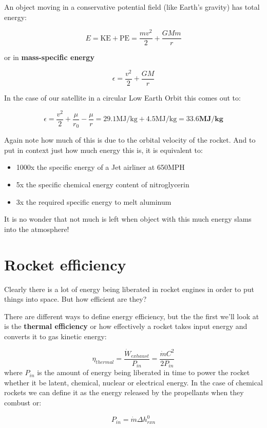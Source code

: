 \documentclass[twocolumn]{memoir} %
\begin{document}
An object moving in a conservative potential field (like Earth's
gravity) has total energy:

\[E = \text{KE} + \text{PE} = \frac{m v^2}{2} + \frac{GMm}{r}\]

or in \textbf{mass-specific energy}

\[\epsilon = \frac{v^2}{2} + \frac{GM}{r}\]

In the case of our satellite in a circular Low Earth Orbit this comes
out to:

\[\epsilon = \frac{v^2}{2} + \frac{\mu}{r_0} - \frac{\mu}{r} = 29.1 \text{MJ/kg} + 4.5 \text{MJ/kg} = \mathbf{33.6} \textbf{MJ/kg}\]

Again note how much of this is due to the orbital velocity of the
rocket. And to put in context just how much energy this is, it is
equivalent to:

\begin{itemize}
\item
  1000x the specific energy of a Jet airliner at 650MPH
\item
  5x the specific chemical energy content of nitroglycerin
\item
  3x the required specific energy to melt aluminum
\end{itemize}

It is no wonder that not much is left when object with this much energy
slams into the atmosphere!

\section{Rocket efficiency}\label{rocket-efficiency}

Clearly there is a lot of energy being liberated in rocket engines in
order to put things into space. But how efficient are they?

There are different ways to define energy efficiency, but the the first
we'll look at is the \textbf{thermal efficiency} or how effectively a
rocket takes input energy and converts it to gas kinetic energy:

\[\eta_{thermal} = \frac{\dot{W}_{exhaust}}{P_{in}} = \frac{\dot{m}C^2}{2P_{in}}\]
where \(P_{in}\) is the amount of energy being liberated in time to
power the rocket whether it be latent, chemical, nuclear or electrical energy. In
the case of chemical rockets we can define it as the energy released by
the propellants when they combust or:

\[P_{in} = \dot{m} \Delta h^0_{rxn}\]
\end{document}
